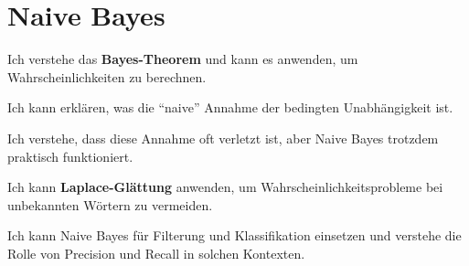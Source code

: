 \section{Naive Bayes}
\begin{todolist}
    \item Ich verstehe das \textbf{Bayes-Theorem} und kann es anwenden, um Wahrscheinlichkeiten zu berechnen.
    \item Ich kann erklären, was die \enquote{naive} Annahme der bedingten Unabhängigkeit ist.
    \item Ich verstehe, dass diese Annahme oft verletzt ist, aber Naive Bayes trotzdem praktisch funktioniert.
    \item Ich kann \textbf{Laplace-Glättung} anwenden, um Wahrscheinlichkeitsprobleme bei unbekannten Wörtern zu vermeiden.
    \item Ich kann Naive Bayes für Filterung und Klassifikation einsetzen und verstehe die Rolle von Precision und Recall in solchen Kontexten.
\end{todolist}

